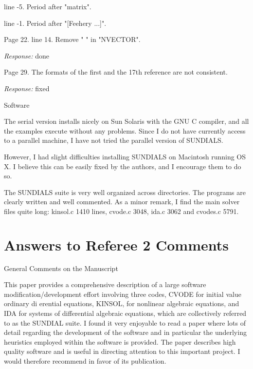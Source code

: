 line -5. Period after "matrix".  

line -1. Period after "[Feehery ...]". 
 
Page 22.  
line 14. Remove " " in "NVECTOR". 

{\em Response:} done
 
Page 29. The formats of the first and the 17th reference are not consistent. 

{\em Response:} fixed

Software 

The serial version installs nicely on Sun Solaris with the GNU C
compiler, and all the examples execute without any problems. Since I
do not have currently access to a parallel machine, I have not tried
the parallel version of SUNDIALS.

However, I had slight difficulties installing SUNDIALS on Macintosh
running OS X. I believe this can be easily fixed by the authors, and I
encourage them to do so.

The SUNDIALS suite is very well organized across directories. The
programs are clearly written and well commented.  As a minor remark, I
find the main solver files quite long: kinsol.c 1410 lines, cvode.c
3048, ida.c 3062 and cvodes.c 5791.


\newpage
\section{Answers to Referee 2 Comments}

General Comments on the Manuscript 

This paper provides a comprehensive description of a large software
modification/development effort involving three codes, CVODE for
initial value ordinary di erential equations, KINSOL, for nonlinear
algebraic equations, and IDA for systems of differential algebraic
equations, which are collectively referred to as the SUNDIAL suite. I
found it very enjoyable to read a paper where lots of detail regarding
the development of the software and in particular the underlying
heuristics employed within the software is provided. The paper
describes high quality software and is useful in directing attention
to this important project.  I would therefore recommend in favor of
its publication.

